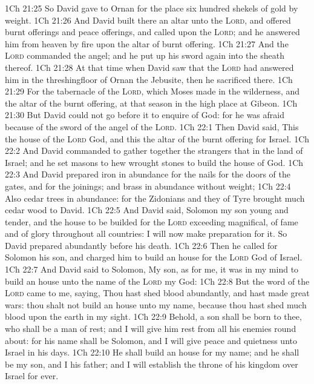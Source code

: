 \vs 1Ch 21:25 So David gave to Ornan for the place six hundred shekels of gold by weight.
\vs 1Ch 21:26 And David built there an altar unto the \textsc{Lord}, and offered burnt offerings and peace offerings, and called upon the \textsc{Lord}; and he answered him from heaven by fire upon the altar of burnt offering.
\vs 1Ch 21:27 And the \textsc{Lord} commanded the angel; and he put up his sword again into the sheath thereof.
\vs 1Ch 21:28 At that time when David saw that the \textsc{Lord} had answered him in the threshingfloor of Ornan the Jebusite, then he sacrificed there.
\vs 1Ch 21:29 For the tabernacle of the \textsc{Lord}, which Moses made in the wilderness, and the altar of the burnt offering,  at that season in the high place at Gibeon.
\vs 1Ch 21:30 But David could not go before it to enquire of God: for he was afraid because of the sword of the angel of the \textsc{Lord}.
\vs 1Ch 22:1 Then David said, This  the house of the \textsc{Lord} God, and this  the altar of the burnt offering for Israel.
\vs 1Ch 22:2 And David commanded to gather together the strangers that  in the land of Israel; and he set masons to hew wrought stones to build the house of God.
\vs 1Ch 22:3 And David prepared iron in abundance for the nails for the doors of the gates, and for the joinings; and brass in abundance without weight;
\vs 1Ch 22:4 Also cedar trees in abundance: for the Zidonians and they of Tyre brought much cedar wood to David.
\vs 1Ch 22:5 And David said, Solomon my son  young and tender, and the house  to be builded for the \textsc{Lord}  exceeding magnifical, of fame and of glory throughout all countries: I will  now make preparation for it. So David prepared abundantly before his death.
\vs 1Ch 22:6 Then he called for Solomon his son, and charged him to build an house for the \textsc{Lord} God of Israel.
\vs 1Ch 22:7 And David said to Solomon, My son, as for me, it was in my mind to build an house unto the name of the \textsc{Lord} my God:
\vs 1Ch 22:8 But the word of the \textsc{Lord} came to me, saying, Thou hast shed blood abundantly, and hast made great wars: thou shalt not build an house unto my name, because thou hast shed much blood upon the earth in my sight.
\vs 1Ch 22:9 Behold, a son shall be born to thee, who shall be a man of rest; and I will give him rest from all his enemies round about: for his name shall be Solomon, and I will give peace and quietness unto Israel in his days.
\vs 1Ch 22:10 He shall build an house for my name; and he shall be my son, and I  his father; and I will establish the throne of his kingdom over Israel for ever.
